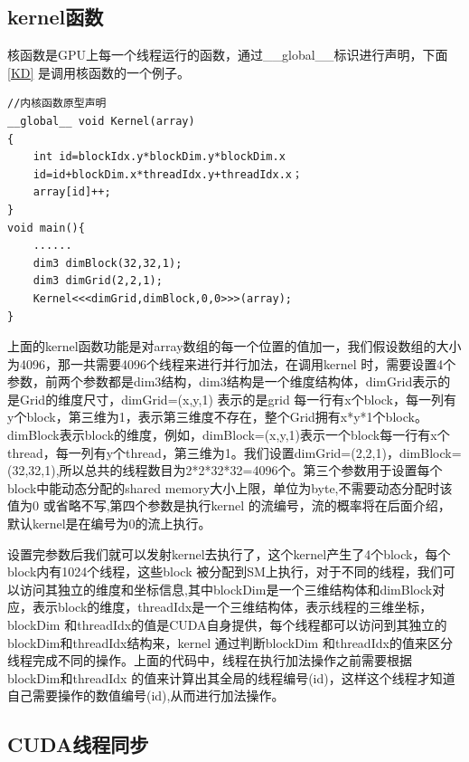 \subsection{kernel函数}
核函数是GPU上每一个线程运行的函数，通过\_\_global\_\_标识进行声明，下面 \ref{KD} 是调用核函数的一个例子。
\begin{lstlisting}[caption={kernel调用代码示例},captionpos=b,firstnumber=1,label={KD}]
//内核函数原型声明
__global__ void Kernel(array)
{
    int id=blockIdx.y*blockDim.y*blockDim.x
    id=id+blockDim.x*threadIdx.y+threadIdx.x；
    array[id]++;
}
void main(){
    ......
    dim3 dimBlock(32,32,1);
    dim3 dimGrid(2,2,1);
    Kernel<<<dimGrid,dimBlock,0,0>>>(array);
}
\end{lstlisting}
上面的kernel函数功能是对array数组的每一个位置的值加一，我们假设数组的大小为4096，那一共需要4096个线程来进行并行加法，在调用kernel 时，需要设置4个参数，前两个参数都是dim3结构，dim3结构是一个维度结构体，dimGrid表示的是Grid的维度尺寸，dimGrid=(x,y,1) 表示的是grid 每一行有x个block，每一列有y个block，第三维为1，表示第三维度不存在，整个Grid拥有x*y*1个block。dimBlock表示block的维度，例如，dimBlock=(x,y,1)表示一个block每一行有x个thread，每一列有y个thread，第三维为1。我们设置dimGrid=(2,2,1)，dimBlock=(32,32,1),所以总共的线程数目为2*2*32*32=4096个。第三个参数用于设置每个block中能动态分配的shared memory大小上限，单位为byte,不需要动态分配时该值为0 或省略不写,第四个参数是执行kernel 的流编号，流的概率将在后面介绍，默认kernel是在编号为0的流上执行。

设置完参数后我们就可以发射kernel去执行了，这个kernel产生了4个block，每个block内有1024个线程，这些block 被分配到SM上执行，对于不同的线程，我们可以访问其独立的维度和坐标信息,其中blockDim是一个三维结构体和dimBlock对应，表示block的维度，threadIdx是一个三维结构体，表示线程的三维坐标，blockDim 和threadIdx的值是CUDA自身提供，每个线程都可以访问到其独立的blockDim和threadIdx结构来，kernel 通过判断blockDim 和threadIdx的值来区分线程完成不同的操作。上面的代码中，线程在执行加法操作之前需要根据blockDim和threadIdx 的值来计算出其全局的线程编号(id)，这样这个线程才知道自己需要操作的数值编号(id),从而进行加法操作。

\subsection{CUDA线程同步}

